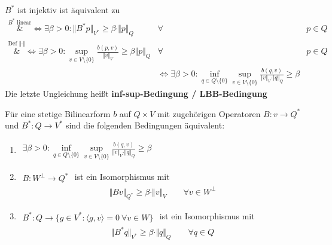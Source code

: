 $B^\ast$ ist injektiv ist äquivalent zu
\begin{align*}
	\overset{B^\ast\text{ linear}}&{\Longleftrightarrow}
	\exists\beta>0:\big\Vert B^\ast p\big\Vert_{V^\ast}\geq\beta\cdot\Vert p\Vert_Q &\forall& p\in Q\\
	\overset{\text{Def }\Vert\cdot\Vert}&\Longleftrightarrow \exists\beta>0:
	\sup\limits_{v\in V\setminus\lbrace0\rbrace}\frac{b(p,v)}{\Vert v\Vert_V}\geq\beta\Vert p\Vert_Q &\forall&p\in Q\\
	&\Longleftrightarrow\exists\beta>0:
	\inf\limits_{q\in Q\setminus\lbrace0\rbrace}\sup\limits_{v\in V\setminus\lbrace0\rbrace}\frac{b(q,v)}{\Vert v\Vert_V\cdot\Vert q\Vert_Q}\geq\beta
\end{align*}
Die letzte Ungleichung heißt \textbf{inf-sup-Bedingung / LBB-Bedingung}

\begin{thm}%
	Für eine stetige Bilinearform $b$ auf $Q\times V$ mit zugehörigen Operatoren
	$B\colon v\to Q^\ast$ und $B^\ast\colon Q\to V^\ast$ sind die folgenden Bedingungen äquivalent:
	\begin{enumerate}[label=(\roman*)]
		\item $\begin{aligned}
			\exists\beta>0:\inf\limits_{q\in Q\setminus\lbrace0\rbrace}\sup\limits_{v\in V\setminus\lbrace 0\rbrace}\frac{b(q,v)}{\Vert v\Vert_V\cdot\Vert q\Vert_Q}\geq\beta
		\end{aligned}$
		\item $\begin{aligned}
			B\colon W^\perp\to Q^\ast
		\end{aligned}$ ist ein Isomorphismus mit 
		\begin{align*}
			\Vert B v\Vert_{Q^\ast}\geq\beta\cdot\Vert v\Vert_V\qquad\forall v\in W^\perp
		\end{align*}
		\item $\begin{aligned}
			B^\ast\colon Q\to\big\lbrace g\in V^\ast:\langle g,v\rangle=0~\forall v\in W\big\rbrace
		\end{aligned}$ ist ein Isomorphismus mit
		\begin{align*}
			\big\Vert B^\ast q\big\Vert_{V^\ast}\geq\beta\cdot\Vert q\Vert_Q\qquad\forall q\in Q
		\end{align*}
	\end{enumerate}
\end{thm}

